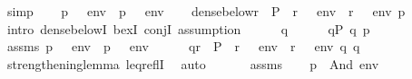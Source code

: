 \begin{isabellebody}
\ simp\isanewline
{}\isamarkupfalse%
\isanewline
\ \ \isamarkupfalse%
\ {\isachardoublequoteopen}{\isacharparenleft}{\kern0pt}p\ {\isasymtturnstile}\ {\isasymphi}\ env{\isacharparenright}{\kern0pt}\ {\isasymand}\ {\isacharparenleft}{\kern0pt}p\ {\isasymtturnstile}\ {\isasympsi}\ env{\isacharparenright}{\kern0pt}{\isachardoublequoteclose}\isanewline
\ \ \isamarkupfalse%
\ {\isachardoublequoteopen}dense{\isacharunderscore}{\kern0pt}below{\isacharparenleft}{\kern0pt}{\isacharbraceleft}{\kern0pt}r\ {\isasymin}\ P\ {\isachardot}{\kern0pt}\ {\isacharparenleft}{\kern0pt}r\ {\isasymtturnstile}\ {\isasymphi}\ env{\isacharparenright}{\kern0pt}\ {\isasymand}\ {\isacharparenleft}{\kern0pt}r\ {\isasymtturnstile}\ {\isasympsi}\ env{\isacharparenright}{\kern0pt}{\isacharbraceright}{\kern0pt}{\isacharcomma}{\kern0pt}\ p{\isacharparenright}{\kern0pt}{\isachardoublequoteclose}\isanewline
\ \ \isamarkupfalse%
\ {\isacharparenleft}{\kern0pt}intro\ dense{\isacharunderscore}{\kern0pt}belowI\ bexI\ conjI{\isacharcomma}{\kern0pt}\ assumption{\isacharparenright}{\kern0pt}\isanewline
\ \ \ \ \isamarkupfalse%
\ q\isanewline
\ \ \ \ \isamarkupfalse%
\ {\isachardoublequoteopen}q{\isasymin}P{\isachardoublequoteclose}\ {\isachardoublequoteopen}q{\isasympreceq}\ p{\isachardoublequoteclose}\isanewline
\ \ \ \ \isamarkupfalse%
\ assms\ {\isacartoucheopen}{\isacharparenleft}{\kern0pt}p\ {\isasymtturnstile}\ {\isasymphi}\ env{\isacharparenright}{\kern0pt}\ {\isasymand}\ {\isacharparenleft}{\kern0pt}p\ {\isasymtturnstile}\ {\isasympsi}\ env{\isacharparenright}{\kern0pt}{\isacartoucheclose}\isanewline
\ \ \ \ \isamarkupfalse%
\ {\isachardoublequoteopen}q{\isasymin}{\isacharbraceleft}{\kern0pt}r\ {\isasymin}\ P\ {\isachardot}{\kern0pt}\ {\isacharparenleft}{\kern0pt}r\ {\isasymtturnstile}\ {\isasymphi}\ env{\isacharparenright}{\kern0pt}\ {\isasymand}\ {\isacharparenleft}{\kern0pt}r\ {\isasymtturnstile}\ {\isasympsi}\ env{\isacharparenright}{\kern0pt}{\isacharbraceright}{\kern0pt}{\isachardoublequoteclose}\ {\isachardoublequoteopen}q{\isasympreceq}\ q{\isachardoublequoteclose}\isanewline
\ \ \ \ \ \ \isamarkupfalse%
\ strengthening{\isacharunderscore}{\kern0pt}lemma\ leq{\isacharunderscore}{\kern0pt}reflI\ \isamarkupfalse%
\ auto\isanewline
\ \ \isamarkupfalse%
\isanewline
\ \ \isamarkupfalse%
\ assms\isanewline
\ \ \isamarkupfalse%
\ {\isachardoublequoteopen}p\ {\isasymtturnstile}\ And{\isacharparenleft}{\kern0pt}{\isasymphi}{\isacharcomma}{\kern0pt}{\isasympsi}{\isacharparenright}{\kern0pt}\ env{\isachardoublequoteclose}\isanewline

\end{isabellebody}

